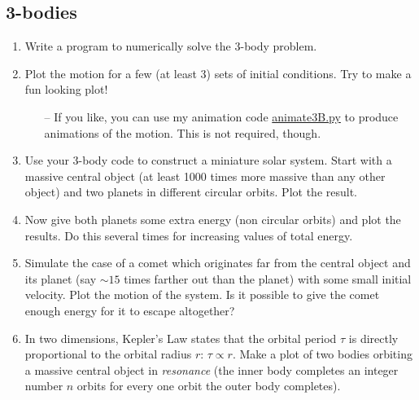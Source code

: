 \documentclass{article}
\begin{document}
\subsection*{3-bodies}
\begin{enumerate}
	\item Write a program to numerically solve the 3-body problem. 
	\item Plot the motion for a few (at least 3) sets of initial conditions. Try to make a fun looking plot!
	\begin{enumerate}
		\item[--] If you like, you can use my animation code \href{https://drive.google.com/file/d/1vWhqohf3zJKXttpdiH-j80_EDhh8MhSF/view?usp=sharing}{animate3B.py} to produce animations of the motion. This is not required, though.
	\end{enumerate}
	\item Use your 3-body code to construct a miniature solar system. Start with a massive central object (at least 1000 times more massive than any other object) and two planets in different circular orbits. Plot the result.
	\item Now give both planets some extra energy (non circular orbits) and plot the results. Do this several times for increasing values of total energy.
	\item Simulate the case of a comet which originates far from the central object and its planet (say $\sim 15$ times farther out than the planet) with some small initial velocity. Plot the motion of the system. Is it possible to give the comet enough energy for it to escape altogether?
	\item In two dimensions, Kepler's Law states that the orbital period $\tau$ is directly proportional to the orbital radius $r$: $\tau\propto r$. Make a plot of two bodies orbiting a massive central object in \textit{resonance} (the inner body completes an integer number $n$ orbits for every one orbit the outer body completes).
\end{enumerate}
\end{document}
